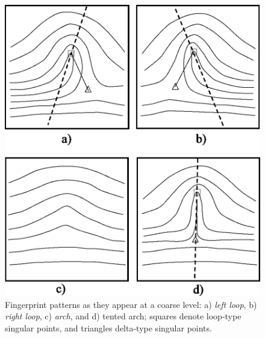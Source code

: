 \documentclass[8pt]{article}
\begin{document}
    \begin{figure}
		\centering
		\includegraphics[scale=0.3]{img/patterns}
		\caption{Fingerprint patterns as they appear at a coarse level: 
        a) \textit{left loop}, 
        b) \textit{right loop}, 
        c) \textit{\textit{arch}}, and 
        d) tented arch; squares denote loop-type singular points, and triangles
			     delta-type singular points.}
		\label{fig:patterns}
	\end{figure}%
   
\end{document}
